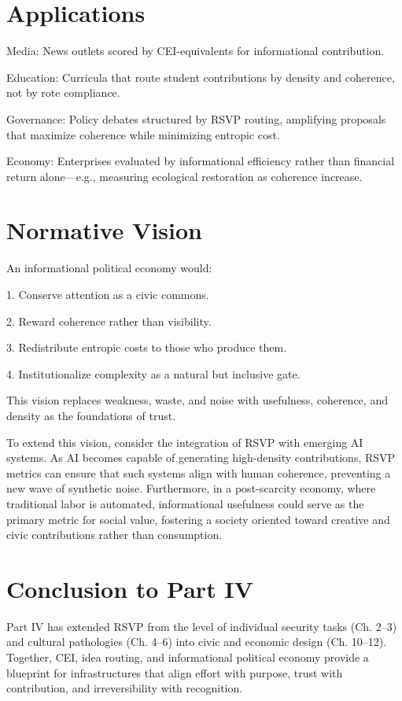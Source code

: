 \documentclass{book}
\begin{document}
\section{Applications}

Media: News outlets scored by CEI-equivalents for informational contribution.

Education: Curricula that route student contributions by density and coherence, not by rote compliance.

Governance: Policy debates structured by RSVP routing, amplifying proposals that maximize coherence while minimizing entropic cost.

Economy: Enterprises evaluated by informational efficiency rather than financial return alone—e.g., measuring ecological restoration as coherence increase.

\section{Normative Vision}

An informational political economy would:

1. Conserve attention as a civic commons.

2. Reward coherence rather than visibility.

3. Redistribute entropic costs to those who produce them.

4. Institutionalize complexity as a natural but inclusive gate.

This vision replaces weakness, waste, and noise with usefulness, coherence, and density as the foundations of trust.

To extend this vision, consider the integration of RSVP with emerging AI systems. As AI becomes capable of generating high-density contributions, RSVP metrics can ensure that such systems align with human coherence, preventing a new wave of synthetic noise. Furthermore, in a post-scarcity economy, where traditional labor is automated, informational usefulness could serve as the primary metric for social value, fostering a society oriented toward creative and civic contributions rather than consumption.

\section{Conclusion to Part IV}

Part IV has extended RSVP from the level of individual security tasks (Ch. 2–3) and cultural pathologies (Ch. 4–6) into civic and economic design (Ch. 10–12). Together, CEI, idea routing, and informational political economy provide a blueprint for infrastructures that align effort with purpose, trust with contribution, and irreversibility with recognition.
\end{document}

